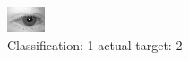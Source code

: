 \begin{figure}[h!]
\begin{center}
\includegraphics[width=0.60\columnwidth]{figures/ID423_class_1_target_2.png}
\end{center}
\caption{ Classification: 1 actual target: 2}
\label{fig:ID423_class_1_target_2}
\end{figure}
